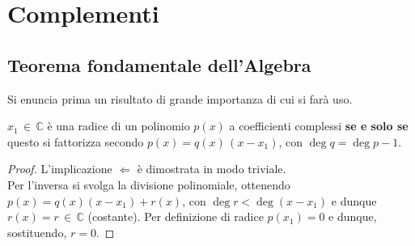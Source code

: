 \documentclass[10pt]{article}
\theoremstyle{plain}
\begin{document}
\section{Complementi}

\subsection{Teorema fondamentale dell'Algebra}
Si enuncia prima un risultato di grande importanza di cui si farà uso.
\begin{lem}
$x_1 \, \in \, \mathbb{C}$ è una radice di un polinomio $p(x)$ a coefficienti complessi \textbf{se e solo se} questo si fattorizza secondo $p(x) = q(x)\, (x-x_1)$, con $\deg q = \deg p - 1$.
\end{lem}
\begin{proof}
L'implicazione $\Leftarrow$ è dimostrata in modo triviale. 
\\Per l'inversa si svolga la divisione polinomiale, ottenendo $p(x) = q(x)(x-x_1) + r(x)$, con $\deg r < \deg (x-x_1)$ e dunque $r(x) = r \, \in \, \mathbb{C}$ (costante). Per definizione di radice $p(x_1) = 0$ e dunque, sostituendo, $r=0$.
\end{proof}
\end{document}

